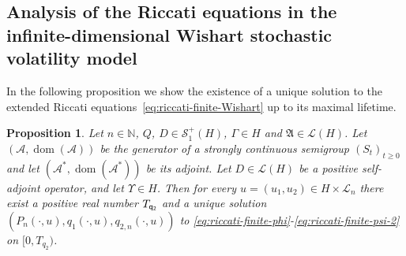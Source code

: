 \documentclass[10pt,a4paper,reqno]{amsart}
\DeclareMathOperator\dom{dom}
\numberwithin{equation}{section}
\newtheorem{proposition}[theorem]{Proposition}
\theoremstyle{plain}
\theoremstyle{definition}
\theoremstyle{example}
\newcommand{\cA}{\mathcal{A}}
\newcommand{\cL}{\mathcal{L}}
\newcommand{\cS}{\mathcal{S}}
\newcommand{\fA}{\mathfrak{A}}
\begin{document}
\subsection{Analysis of the Riccati equations in the infinite-dimensional Wishart stochastic volatility model}
In the following proposition we show the existence of a unique solution to the
extended Riccati equations~\eqref{eq:riccati-finite-Wishart} 
up to its maximal lifetime.
\begin{proposition}\label{prop:extended-Riccati-existence-Wishart}
Let $n \in \mathbb{N}$, $Q$, $D \in \cS_1^+(H)$, $\Gamma \in H$ and $\fA \in \cL(H)$. Let $(\cA, \dom(\cA))$ be the generator of a strongly continuous semigroup $(S_t)_{t\geq 0}$ and let $(\cA^*, \dom(\cA^*))$ be its adjoint. Let $D \in \cL(H)$ be a positive
self-adjoint operator, and let $\Upsilon \in H$. Then for every $u=(u_{1},u_{2})\in H\times \cL_n$ there
exist a positive real number $T_{\sf q_{2}}$ and a unique solution $(P_n(\cdot,u), q_{1}(\cdot,u),
q_{2,n}(\cdot,u))$ to \eqref{eq:riccati-finite-phi}-\eqref{eq:riccati-finite-psi-2}
on $[0,T_{q_{2}})$.
\end{proposition}
\end{document}
